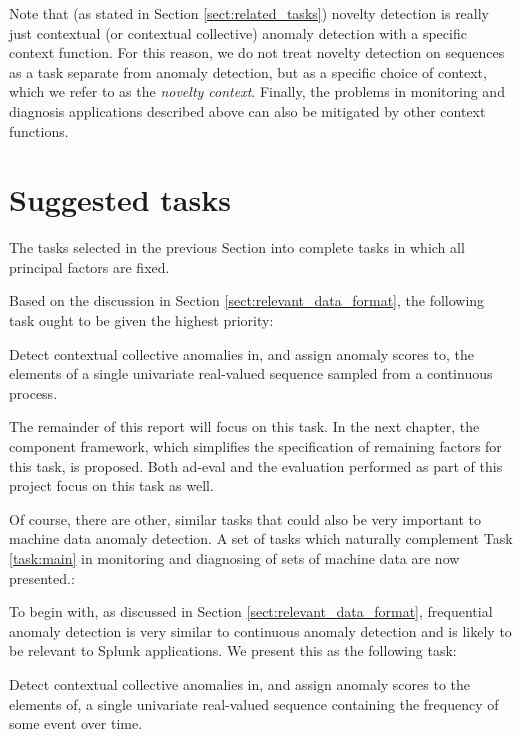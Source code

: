 Note that (as stated in Section \ref{sect:related_tasks}) novelty detection is really just contextual (or contextual collective) anomaly detection with a specific context function. For this reason, we do not treat novelty detection on sequences as a task separate from anomaly detection, but as a specific choice of context, which we refer to as the \emph{novelty context}. Finally, the problems in monitoring and diagnosis applications described above can also be mitigated by other context functions. 

\section{Suggested tasks}
\label{sect:suggested_tasks}

The tasks selected in the previous Section into complete tasks in which all principal factors are fixed.

Based on the discussion in Section \ref{sect:relevant_data_format}, the following task ought to be given the highest priority:
\begin{task}
  \label{task:main}
  Detect contextual collective anomalies in, and assign anomaly scores to, the elements of a single univariate real-valued sequence sampled from a continuous process.
\end{task}

The remainder of this report will focus on this task. In the next chapter, the component framework, which simplifies the specification of remaining factors for this task, is proposed. Both ad-eval and the evaluation performed as part of this project focus on this task as well.

Of course, there are other, similar tasks that could also be very important to machine data anomaly detection. A set of tasks which naturally complement Task \ref{task:main} in monitoring and diagnosing of sets of machine data are now presented.:

To begin with, as discussed in Section \ref{sect:relevant_data_format}, frequential anomaly detection is very similar to continuous anomaly detection and is likely to be relevant to Splunk applications. We present this as the following task:

\begin{task}
  Detect contextual collective anomalies in, and assign anomaly scores to the elements of, a single univariate real-valued sequence containing the frequency of some event over time.
\end{task}

